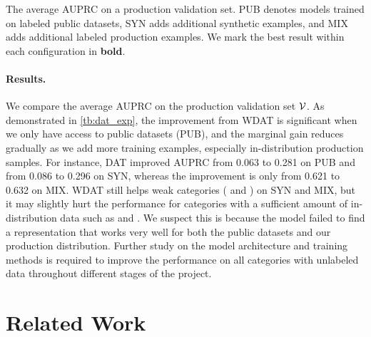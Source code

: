 \documentclass[letterpaper]{article} %
\begin{document}
\begin{table}[!t]
 \centering
 \resizebox{\columnwidth}{!}{}
 \caption{The average AUPRC on a production validation set. PUB denotes models trained on labeled public datasets, SYN adds additional synthetic examples, and MIX adds additional labeled production examples. We mark the best result within each configuration in \textbf{bold}.}
 \label{tb:dat_exp}
\end{table}

\paragraph{Results.} We compare the average AUPRC on the production validation set $\mathcal{V}$. As demonstrated in \cref{tb:dat_exp}, the improvement from WDAT is significant when we only have access to public datasets (PUB), and the marginal gain reduces gradually as we add more training examples, especially in-distribution production samples.
For instance, DAT improved  AUPRC from 0.063 to 0.281 on PUB and from 0.086 to 0.296 on SYN, whereas the improvement is only from 0.621 to 0.632 on MIX.
WDAT still helps weak categories ( and ) on SYN and MIX, but it may slightly hurt the performance for categories with a sufficient amount of in-distribution data such as  and . We suspect this is because the model failed to find a representation that works very well for both the public datasets and our production distribution.
Further study on the model architecture and training methods is required to improve the performance on all categories with unlabeled data throughout different stages of the project.



\section{Related Work}
\end{document}
